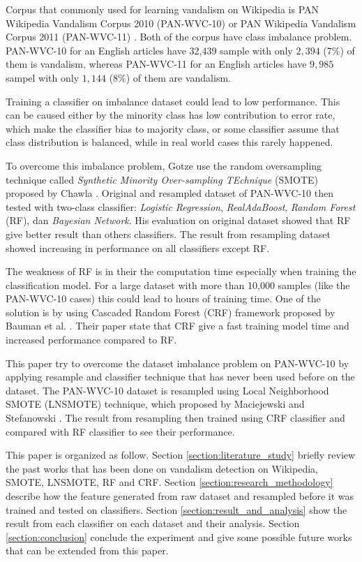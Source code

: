 \documentclass[conference,compsoc,a4paper,twocolumn,final]{IEEEtran}
\begin{document}
Corpus that commonly used for learning vandalism on Wikipedia is PAN Wikipedia
Vandalism Corpus 2010 (PAN-WVC-10)
\cite{potthast:2010b}
or PAN Wikipedia Vandalism Corpus 2011 (PAN-WVC-11)
\cite{potthast:2010b}.
Both of the corpus have class imbalance problem.
PAN-WVC-10 for an English articles have 32,439 sample with only $2,394$ (7\%)
of them is vandalism, whereas PAN-WVC-11 for an English articles have $9,985$
sampel with only $1,144$ (8\%) of them are vandalism.

Training a classifier on imbalance dataset could lead to low performance.
This can be caused either by the minority class has low contribution to error
rate, which make the classifier bias to majority class, or some classifier
assume that class distribution is balanced, while in real world cases this
rarely happened.

To overcome this imbalance problem, Gotze
\cite{gotze2014advanced}
use the random oversampling technique called
\textit{Synthetic Minority Over-sampling TEchnique} (SMOTE)
proposed by Chawla
\cite{chawla2002smote}.
Original and resampled dataset of PAN-WVC-10 then tested with two-class
classifier:
\textit{Logistic Regression},
\textit{RealAdaBoost},
\textit{Random Forest} (RF), dan
\textit{Bayesian Network}.
His evaluation on original dataset showed that RF give better result than
others classifiers.
The result from resampling dataset showed increasing in performance on all
classifiers except RF.

The weakness of RF is in their the computation time especially when training
the classification model.
For a large dataset with more than 10,000 samples (like the PAN-WVC-10 cases)
this could lead to hours of training time.
One of the solution is by using Cascaded Random Forest (CRF) framework proposed
by Bauman et al.
\cite{baumann2013cascaded}.
Their paper state that CRF give a fast training model time and increased
performance compared to RF.

This paper try to overcome the dataset imbalance problem on PAN-WVC-10 by
applying resample and classifier technique that has never been used before on
the dataset.
The PAN-WVC-10 dataset is resampled using Local Neighborhood SMOTE (LNSMOTE)
technique,
which proposed by Maciejewski and Stefanowski
\cite{maciejewski2011local}.
The result from resampling then trained using CRF classifier and compared with
RF classifier to see their performance.

This paper is organized as follow.
Section \ref{section:literature_study} briefly review the past works that has
been done on vandalism detection on Wikipedia, SMOTE, LNSMOTE, RF and CRF.
Section \ref{section:research_methodology} describe how the feature generated
from raw dataset and resampled before it was trained and tested on classifiers.
Section \ref{section:result_and_analysis} show the result from each classifier
on each dataset and their analysis.
Section \ref{section:conclusion} conclude the experiment and
give some possible future works that can be extended from this paper.
\end{document}
